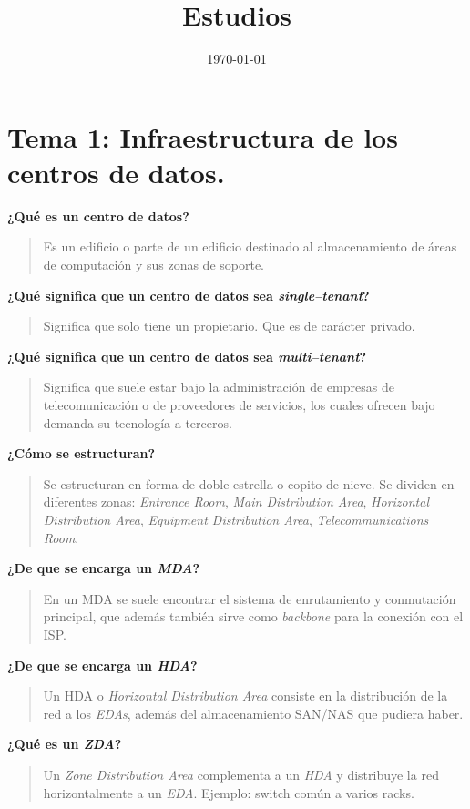 \documentclass[11pt]{article}
\date{\today}
\title{Estudios}
\begin{document}
\maketitle
\tableofcontents


\section{Tema 1: Infraestructura de los centros de datos.}
\label{sec:org1cfdf28}
\textbf{¿Qué es un centro de datos?}
\begin{quote}
Es un edificio o parte de un edificio destinado al almacenamiento de áreas de computación y sus zonas de soporte.
\end{quote}

\textbf{¿Qué significa que un centro de datos sea \emph{single--tenant}?}
\begin{quote}
Significa que solo tiene un propietario. Que es de carácter privado.
\end{quote}

\textbf{¿Qué significa que un centro de datos sea \emph{multi--tenant}?}
\begin{quote}
Significa que suele estar bajo la administración de empresas de telecomunicación o de proveedores de servicios, los cuales ofrecen bajo demanda su tecnología a terceros.
\end{quote}

\textbf{¿Cómo se estructuran?}
\begin{quote}
Se estructuran en forma de doble estrella o copito de nieve. Se dividen en diferentes zonas: \emph{Entrance Room}, \emph{Main Distribution Area}, \emph{Horizontal Distribution Area}, \emph{Equipment Distribution Area}, \emph{Telecommunications Room}.
\end{quote}

\textbf{¿De que se encarga un \emph{MDA}?}
\begin{quote}
En un MDA se suele encontrar el sistema de enrutamiento y conmutación principal, que además también sirve como \emph{backbone} para la conexión con el ISP.
\end{quote}

\textbf{¿De que se encarga un \emph{HDA}?}
\begin{quote}
Un HDA o \emph{Horizontal Distribution Area} consiste en la distribución de la red a los \emph{EDAs}, además del almacenamiento SAN/NAS que pudiera haber.
\end{quote}

\textbf{¿Qué es un \emph{ZDA}?}
\begin{quote}
Un \emph{Zone Distribution Area} complementa a un \emph{HDA} y distribuye la red horizontalmente a un \emph{EDA}.
Ejemplo: switch común a varios racks.
\end{quote}
\end{document}
